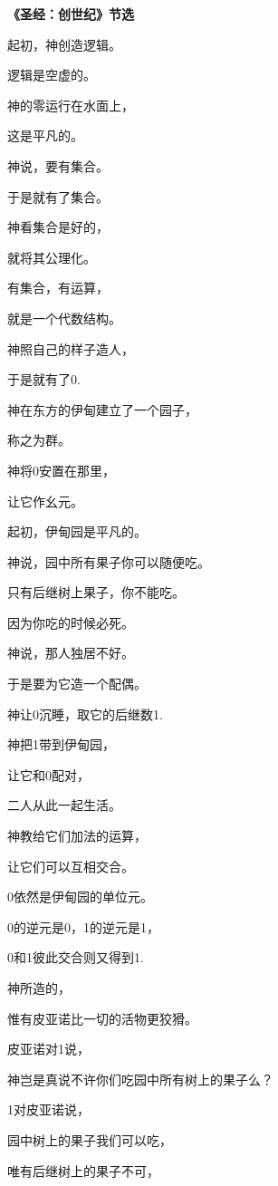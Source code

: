 \begin{centering}
\begin{Large}
\textbf{《圣经：创世纪》节选}
\end{Large}\vsp
\large

起初，神创造逻辑。

逻辑是空虚的。

神的零运行在水面上，

这是平凡的。

神说，要有集合。

于是就有了集合。

神看集合是好的，

就将其公理化。

有集合，有运算，

就是一个代数结构。\vsp

神照自己的样子造人，

于是就有了0.

神在东方的伊甸建立了一个园子，

称之为群。

神将0安置在那里，

让它作幺元。

起初，伊甸园是平凡的。

神说，园中所有果子你可以随便吃。

只有后继树上果子，你不能吃。

因为你吃的时候必死。\vsp

神说，那人独居不好。

于是要为它造一个配偶。

神让0沉睡，取它的后继数1.

神把1带到伊甸园，

让它和0配对，

二人从此一起生活。

神教给它们加法的运算，

让它们可以互相交合。

0依然是伊甸园的单位元。

0的逆元是0，1的逆元是1，

0和1彼此交合则又得到1.\vsp

神所造的，

惟有皮亚诺比一切的活物更狡猾。

皮亚诺对1说，

神岂是真说不许你们吃园中所有树上的果子么？

1对皮亚诺说，

园中树上的果子我们可以吃，

唯有后继树上的果子不可，


\end{centering}
